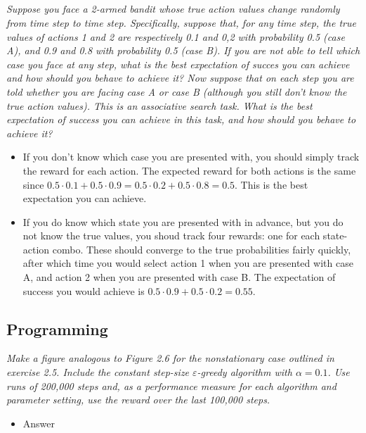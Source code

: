 \documentclass{article}
\begin{document}
\subsection{}
\textit{Suppose you face a 2-armed bandit whose true action values change randomly from time step to time step. Specifically, suppose that, for any time step, the true values of actions 1 and 2 are respectively 0.1 and 0,2 with probability 0.5 (case A), and 0.9 and 0.8 with probability 0.5 (case B). If you are not able to tell which case you face at any step, what is the best expectation of succes you can achieve and how should you behave to achieve it?  Now suppose that on each step you are told whether you are facing case A or case B (although you still don't know the true action values). This is an associative search task. What is the best expectation of success you can achieve in this task, and how should you behave to achieve it?}
\begin{itemize}
\item If you don't know which case you are presented with, you should simply track the reward for each action. The expected reward for both actions is the same since $0.5 \cdot 0.1 + 0.5 \cdot 0.9 = 0.5 \cdot 0.2 + 0.5 \cdot 0.8 = 0.5$. This is the best expectation you can achieve.
\item If you do know which state you are presented with in advance, but you do not know the true values, you shoud track four rewards: one for each state-action combo. These should converge to the true probabilities fairly quickly, after which time you would select action 1 when you are presented with case A, and action 2 when you are presented with case B. The expectation of success you would achieve is $0.5 \cdot 0.9 + 0.5 \cdot 0.2 = 0.55$.
\end{itemize}

\subsection{Programming}
\textit{Make a figure analogous to Figure 2.6 for the nonstationary case outlined in exercise 2.5. Include the constant step-size $\varepsilon$-greedy algorithm with $\alpha = 0.1$. Use runs of 200,000 steps and, as a performance measure for each algorithm and parameter setting, use the reward over the last 100,000 steps.}
\begin{itemize}
\item Answer
\end{itemize}
\end{document}
